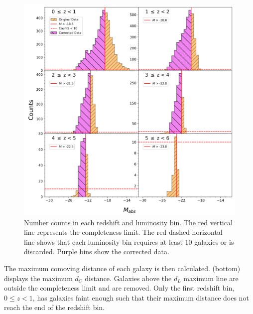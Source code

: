 \begin{figure}[t!]
    \centering
    \includegraphics[width=\textwidth]{Figures/Magnitude Counts.png}
    \caption{Number counts in each redshift and luminosity bin. The red vertical line represents the completeness limit. The red dashed horizontal line shows that each luminosity bin requires at least 10 galaxies or is discarded. Purple bins show the corrected data.}
    \label{Fig: Magnitude Counts}
\end{figure}

The maximum comoving distance of each galaxy is then calculated.  (bottom) displays the maximum $d_C$ distance. Galaxies above the $d_L$ maximum line are outside the completeness limit and are removed. Only the first redshift bin, $0 \leq z < 1$, has galaxies faint enough such that their maximum distance does not reach the end of the redshift bin. 


